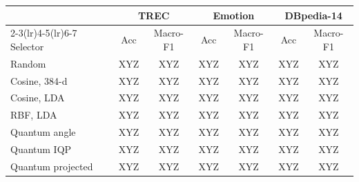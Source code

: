 \begin{tabular}{@{}l cc cc cc@{}}
\toprule
 & \multicolumn{2}{c}{TREC} & \multicolumn{2}{c}{Emotion} & \multicolumn{2}{c}{DBpedia-14} \\
\cmidrule(lr){2-3}\cmidrule(lr){4-5}\cmidrule(lr){6-7}
Selector & Acc & Macro-F1 & Acc & Macro-F1 & Acc & Macro-F1 \\
\midrule
Random & XYZ & XYZ & XYZ & XYZ & XYZ & XYZ \\
Cosine, 384-d & XYZ & XYZ & XYZ & XYZ & XYZ & XYZ \\
Cosine, LDA & XYZ & XYZ & XYZ & XYZ & XYZ & XYZ \\
RBF, LDA & XYZ & XYZ & XYZ & XYZ & XYZ & XYZ \\
Quantum angle & XYZ & XYZ & XYZ & XYZ & XYZ & XYZ \\
Quantum IQP & XYZ & XYZ & XYZ & XYZ & XYZ & XYZ \\
Quantum projected & XYZ & XYZ & XYZ & XYZ & XYZ & XYZ \\
\bottomrule
\end{tabular}
